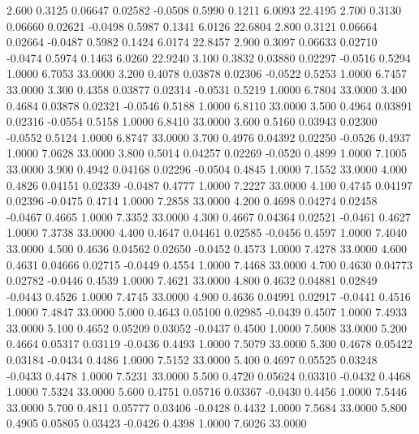    2.600   0.3125   0.06647   0.02582  -0.0508   0.5990   0.1211   6.0093  22.4195
   2.700   0.3130   0.06660   0.02621  -0.0498   0.5987   0.1341   6.0126  22.6804
   2.800   0.3121   0.06664   0.02664  -0.0487   0.5982   0.1424   6.0174  22.8457
   2.900   0.3097   0.06633   0.02710  -0.0474   0.5974   0.1463   6.0260  22.9240
   3.100   0.3832   0.03880   0.02297  -0.0516   0.5294   1.0000   6.7053  33.0000
   3.200   0.4078   0.03878   0.02306  -0.0522   0.5253   1.0000   6.7457  33.0000
   3.300   0.4358   0.03877   0.02314  -0.0531   0.5219   1.0000   6.7804  33.0000
   3.400   0.4684   0.03878   0.02321  -0.0546   0.5188   1.0000   6.8110  33.0000
   3.500   0.4964   0.03891   0.02316  -0.0554   0.5158   1.0000   6.8410  33.0000
   3.600   0.5160   0.03943   0.02300  -0.0552   0.5124   1.0000   6.8747  33.0000
   3.700   0.4976   0.04392   0.02250  -0.0526   0.4937   1.0000   7.0628  33.0000
   3.800   0.5014   0.04257   0.02269  -0.0520   0.4899   1.0000   7.1005  33.0000
   3.900   0.4942   0.04168   0.02296  -0.0504   0.4845   1.0000   7.1552  33.0000
   4.000   0.4826   0.04151   0.02339  -0.0487   0.4777   1.0000   7.2227  33.0000
   4.100   0.4745   0.04197   0.02396  -0.0475   0.4714   1.0000   7.2858  33.0000
   4.200   0.4698   0.04274   0.02458  -0.0467   0.4665   1.0000   7.3352  33.0000
   4.300   0.4667   0.04364   0.02521  -0.0461   0.4627   1.0000   7.3738  33.0000
   4.400   0.4647   0.04461   0.02585  -0.0456   0.4597   1.0000   7.4040  33.0000
   4.500   0.4636   0.04562   0.02650  -0.0452   0.4573   1.0000   7.4278  33.0000
   4.600   0.4631   0.04666   0.02715  -0.0449   0.4554   1.0000   7.4468  33.0000
   4.700   0.4630   0.04773   0.02782  -0.0446   0.4539   1.0000   7.4621  33.0000
   4.800   0.4632   0.04881   0.02849  -0.0443   0.4526   1.0000   7.4745  33.0000
   4.900   0.4636   0.04991   0.02917  -0.0441   0.4516   1.0000   7.4847  33.0000
   5.000   0.4643   0.05100   0.02985  -0.0439   0.4507   1.0000   7.4933  33.0000
   5.100   0.4652   0.05209   0.03052  -0.0437   0.4500   1.0000   7.5008  33.0000
   5.200   0.4664   0.05317   0.03119  -0.0436   0.4493   1.0000   7.5079  33.0000
   5.300   0.4678   0.05422   0.03184  -0.0434   0.4486   1.0000   7.5152  33.0000
   5.400   0.4697   0.05525   0.03248  -0.0433   0.4478   1.0000   7.5231  33.0000
   5.500   0.4720   0.05624   0.03310  -0.0432   0.4468   1.0000   7.5324  33.0000
   5.600   0.4751   0.05716   0.03367  -0.0430   0.4456   1.0000   7.5446  33.0000
   5.700   0.4811   0.05777   0.03406  -0.0428   0.4432   1.0000   7.5684  33.0000
   5.800   0.4905   0.05805   0.03423  -0.0426   0.4398   1.0000   7.6026  33.0000
